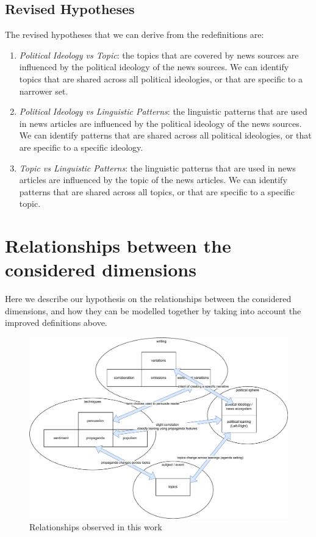 \subsection{Revised Hypotheses}

The revised hypotheses that we can derive from the redefinitions are:

\begin{enumerate}
    \item \emph{Political Ideology vs Topic}: the topics that are covered by news sources are influenced by the political ideology of the news sources. We can identify topics that are shared across all political ideologies, or that are specific to a narrower set.
    \item \emph{Political Ideology vs Linguistic Patterns}: the linguistic patterns that are used in news articles are influenced by the political ideology of the news sources. We can identify patterns that are shared across all political ideologies, or that are specific to a specific ideology.
    \item \emph{Topic vs Linguistic Patterns}: the linguistic patterns that are used in news articles are influenced by the topic of the news articles. We can identify patterns that are shared across all topics, or that are specific to a specific topic.
\end{enumerate}


\section{Relationships between the considered dimensions}

Here we describe our hypothesis on the relationships between the considered dimensions, and how they can be modelled together by taking into account the improved definitions above.

\begin{figure}[!htbp]
    \centering
    \includegraphics[width=\linewidth]{relationships.pdf}
    \caption{Relationships observed in this work}
    \label{fig:relationships}
\end{figure}

